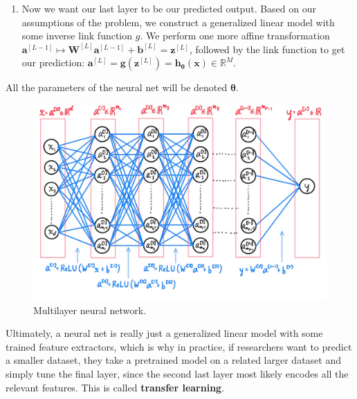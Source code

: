 \documentclass{article}
\begin{document}
\begin{definition}
\begin{enumerate}
        \item Now we want our last layer to be our predicted output. Based on our assumptions of the problem, we construct a generalized linear model with some inverse link function $g$. We perform one more affine transformation $\mathbf{a}^{[L-1]} \mapsto \mathbf{W}^{[L]} \mathbf{a}^{[L-1]} + \mathbf{b}^{[L]} = \mathbf{z}^{[L]}$, followed by the link function to get our prediction: $\mathbf{a}^{[L]} = \mathbf{g}(\mathbf{z}^{[L]}) = \mathbf{h}_{\boldsymbol{\theta}} (\mathbf{x}) \in \mathbb{R}^M$. 
      \end{enumerate}
      All the parameters of the neural net will be denoted $\boldsymbol{\theta}$. 
      \begin{figure}[H]
        \centering 
        \includegraphics[scale=0.2]{img/01_MLP/Multilayer_Neural_Net.jpg}
        \caption{Multilayer neural network.} 
        \label{fig:multilayer_neural_net}
      \end{figure}
      Ultimately, a neural net is really just a generalized linear model with some trained feature extractors, which is why in practice, if researchers want to predict a smaller dataset, they take a pretrained model on a related larger dataset and simply tune the final layer, since the second last layer most likely encodes all the relevant features. This is called \textbf{transfer learning}. 
    \end{definition}
\end{document}
